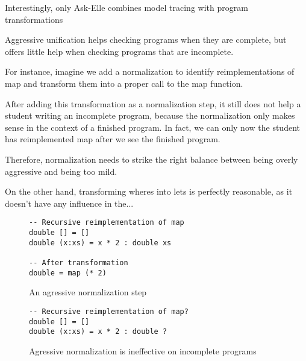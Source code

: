 Interestingly, only Ask-Elle combines model tracing with program transformations \cite{2016feedbackreview}

Aggressive unification helps checking programs when they are complete, but offers little help when checking programs that are incomplete.

For instance, imagine we add a normalization to identify reimplementations of map and transform them into a proper call to the map function.

After adding this transformation as a normalization step, it still does not help a student writing an incomplete program, because the normalization only makes sense in the context of a finished program. In fact, we can only now the student has reimplemented map after we see the finished program.

Therefore, normalization needs to strike the right balance between being overly aggressive and being too mild.

On the other hand, transforming wheres into lets is perfectly reasonable, as it doesn't have any influence in the...

\begin{figure}
\begin{verbatim}
-- Recursive reimplementation of map
double [] = []
double (x:xs) = x * 2 : double xs

-- After transformation
double = map (* 2)
\end{verbatim}
\caption{An agressive normalization step}
\end{figure}

\begin{figure}
\begin{verbatim}
-- Recursive reimplementation of map?
double [] = []
double (x:xs) = x * 2 : double ?
\end{verbatim}
\caption{Agressive normalization is ineffective on incomplete programs}
\end{figure}

